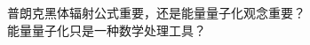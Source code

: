 
\begin{frame}
    \frametitle{}
    \begin{tcolorbox3}[学术讨论]
        普朗克黑体辐射公式重要，还是能量量子化观念重要？\\
        能量量子化只是一种数学处理工具？
    \end{tcolorbox3}
\end{frame}

